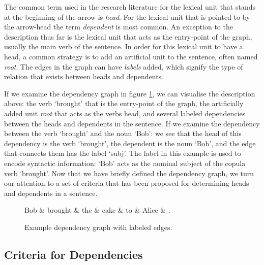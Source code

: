 The common term used in the research literature for the lexical unit that stands at the beginning of the arrow is \textit{head}. For the lexical unit that is pointed to by the arrow-head the term \textit{dependent} is most common. An exception to the description thus far is the lexical unit that acts as the entry-point of the graph, usually the main verb of the sentence. In order for this lexical unit to have a head, a common strategy is to add an artificial unit to the sentence, often named \textit{root}. The edges in the graph can have \textit{labels} added, which signify the type of relation that exists between heads and dependents. 

If we examine the dependency graph in figure \ref{dep1}, we can visualise the description above: the verb `brought' that is the entry-point of the graph, the artificially added unit \textit{root} that acts as the verbs head, and several labeled dependencies between the heads and dependents in the sentence. If we examine the dependency between the verb `brought' and the noun `Bob': we see that the head of this dependency is the verb `brought', the dependent is the noun `Bob', and the edge that connects them has the label `subj'. The label in this example is used to encode syntactic information: `Bob' acts as the nominal subject of the copula verb `brought'. Now that we have briefly defined the dependency graph, we turn our attention to a set of criteria that has been proposed for determining heads and dependents in a sentence.

\begin{figure}
    \centering
    \begin{dependency}[]
        \begin{deptext}[column sep=1em, row sep=.1ex]
            Bob \& brought \& the \& cake \& to \& Alice \& . \\
        \end{deptext}
    \end{dependency}
    \caption{Example dependency graph with labeled edges.}
    \label{dep1}
\end{figure}

\subsection{Criteria for Dependencies}
\label{criteria}

